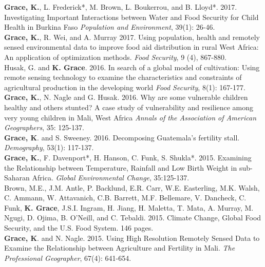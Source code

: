 \documentclass[11pt]{article} %
\begin{document}
\noindent
\textbf{Grace, K.}, L. Frederick*, M. Brown, L. Boukerrou, and B. Lloyd*. 2017. Investigating Important Interactions between Water and Food Security for Child Health in Burkina Faso \textit{Population and Environment}, 39(1): 26-46.\\


\noindent
\textbf{Grace, K.}, R. Wei, and A. Murray 2017.  Using population, health and remotely sensed environmental data to improve food aid distribution in rural West Africa: An application of optimization methods. \textit{Food Security}, 9 (4), 867-880.\\


\noindent
Husak, G. and \textbf{K. Grace}. 2016. In search of a global model of cultivation:  Using remote sensing technology to examine the characteristics and constraints of agricultural production in the developing world \textit{Food Security}, 8(1): 167-177.\\

\noindent
\textbf{Grace, K.}, N. Nagle and G. Husak. 2016. Why are some vulnerable children healthy and others stunted?  A case study of vulnerability and resilience among very young children in Mali, West Africa \textit{Annals of the Association of American Geographers}, 35: 125-137.\\

\noindent
\textbf{Grace, K}. and S. Sweeney. 2016.  Decomposing Guatemala's fertility stall. \textit{Demography}, 53(1): 117-137.\\

\noindent
\textbf{Grace, K.}, F. Davenport*, H. Hanson, C. Funk, S. Shukla*. 2015. Examining the Relationship between Temperature, Rainfall and Low Birth Weight in sub-Saharan Africa.  \textit{Global Environmental Change}, 35:125-137.\\

\noindent
Brown, M.E., J.M. Antle, P. Backlund, E.R. Carr, W.E. Easterling, M.K. Walsh, C. Ammann, W. Attavanich, C.B. Barrett, M.F. Bellemare, V. Dancheck, C. Funk, \textbf{K. Grace}, J.S.I. Ingram, H. Jiang, H. Maletta, T. Mata, A. Murray, M. Ngugi, D. Ojima, B. O'Neill, and C. Tebaldi. 2015. Climate Change, Global Food Security, and the U.S. Food System. 146 pages.
 \\

\noindent
\textbf{Grace, K}. and N. Nagle. 2015. Using High Resolution Remotely Sensed Data to Examine the Relationship between Agriculture and Fertility in Mali.  \textit{The Professional Geographer}, 67(4): 641-654.\\
\end{document}
